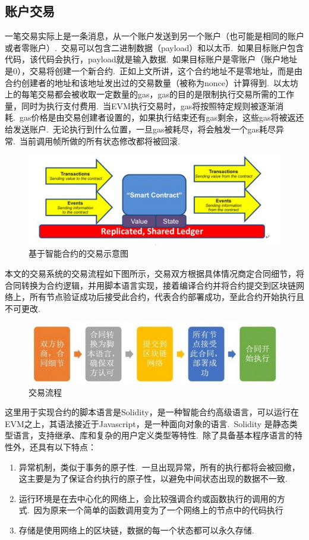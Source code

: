 \documentclass[a4paper,12pt,titlepage]{ctexart}
\begin{document}
\subsection{账户交易}
一笔交易实际上是一条消息，从一个账户发送到另一个账户（也可能是相同的账户或者零账户）.~交易可以包含二进制数据（payload）和以太币.~如果目标账户包含代码，该代码会执行，payload就是输入数据.~如果目标账户是零账户（账户地址是0），交易将创建一个新合约.~正如上文所讲，这个合约地址不是零地址，而是由合约创建者的地址和该地址发出过的交易数量（被称为nonce）计算得到.~以太坊上的每笔交易都会被收取一定数量的gas，gas的目的是限制执行交易所需的工作量，同时为执行支付费用.~当EVM执行交易时，gas将按照特定规则被逐渐消耗.~gas价格是由交易创建者设置的，如果执行结束还有gas剩余，这些gas将被返还给发送账户.~无论执行到什么位置，一旦gas被耗尽，将会触发一个gas耗尽异常.~当前调用帧所做的所有状态修改都将被回滚.~\par
\begin{figure}[!hbp]
	\centering
	\includegraphics[scale=0.9]{fig9.jpg}
	\caption{基于智能合约的交易示意图}
\end{figure}
本文的交易系统的交易流程如下图所示，交易双方根据具体情况商定合同细节，将合同转换为合约逻辑，并用脚本语言实现，接着编译合约并将合约提交到区块链网络上，所有节点验证成功后接受此合约，代表合约部署成功，至此合约开始执行且不可更改.~\par
\begin{figure}[!hbp]
	\centering
	\includegraphics[scale=0.6]{fig5.jpg}
	\caption{交易流程}
\end{figure}
这里用于实现合约的脚本语言是Solidity，是一种智能合约高级语言，可以运行在EVM之上，其语法接近于Javascript，是一种面向对象的语言.~Solidity 是静态类型语言，支持继承、库和复杂的用户定义类型等特性.~除了具备基本程序语言的特性外，还具有以下特点：
\begin{enumerate}
\item 异常机制，类似于事务的原子性.~一旦出现异常，所有的执行都将会被回撤，这主要是为了保证合约执行的原子性，以避免中间状态出现的数据不一致.~
\item 运行环境是在去中心化的网络上，会比较强调合约或函数执行的调用的方式.~因为原来一个简单的函数调用变为了一个网络上的节点中的代码执行
\item 存储是使用网络上的区块链，数据的每一个状态都可以永久存储.~
\end{enumerate}\par
\end{document}
